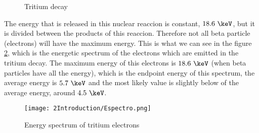 \begin{figure}[hbtp]
 \centering
 \caption{Tritium decay}
 \label{fig:TritiumDecay}
\end{figure}

The energy that is released in this nuclear reaccion is constant, $18.6~\keV$, but it is divided between the products of this reaccion. Therefore not all beta particle (electrons) will have the maximum energy. This is what we can see in the figure \ref{fig:TritiumDecaySpectrum}, which is the energetic spectrum of the electrons which are emitted in the tritium decay. The maximum energy of this electrons is $18.6~\keV$ (when beta particles have all the energy), which is the endpoint energy of this spectrum, the average energy is $5.7~\keV$ and the most likely value is slightly below of the average energy, around $4.5~\keV$.

\begin{figure}[hbtp]
\texttt{[image: 2Introduction/Espectro.png]}
\centering
\caption{Energy spectrum of tritium electrons ~\cite{TesisTritio}\label{fig:TritiumDecaySpectrum}}
\end{figure}




